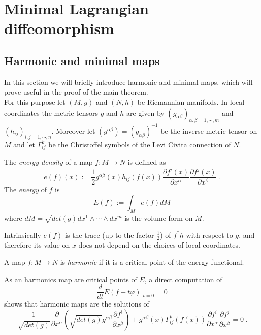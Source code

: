 \chapter{Minimal Lagrangian diffeomorphism}


\section{Harmonic and minimal maps}
In this section we will briefly introduce harmonic and minimal maps, which will prove useful in the proof of the main theorem.\\
For this purpose let $(M,g)$ and $(N,h)$ be Riemannian manifolds. In local coordinates the metric tensors $g$ and $h$ are given by $(g_{\alpha \beta})_{\alpha,\beta = 1,\cdots, m}$ and $(h_{ij})_{i,j= 1,\cdots,n}$. Moreover let $(g^{\alpha \beta}) = (g_{\alpha \beta})^{-1}$ be the inverse metric tensor on $M$ and let $\Gamma^k_{ij}$ be the Christoffel symbols of the Levi Civita connection of $N$.\\
\begin{definition}
    The \textit{energy density} of a map $f:M \to N$ is defined as
    \begin{equation}
        e(f)(x) := \frac{1}{2} g^{\alpha \beta}(x)h_{ij}(f(x)) \frac{\partial f^i (x)}{\partial x^\alpha}  \frac{\partial f^j (x)}{\partial x^\beta} \ .
    \end{equation}
    The \textit{energy} of $f$ is
    \begin{equation}
        E(f) := \int_M e(f)dM
    \end{equation}
    where $dM = \sqrt{det(g)} dx^1 \wedge \cdots \wedge dx^m$ is the volume form on $M$.
\end{definition}
\begin{observation}
    Intrinsically $e(f)$ is the trace (up to the factor $\frac{1}{2}$) of $f^* h$ with respect to $g$, and therefore its value on $x$ does not depend on the choices of local coordinates.
\end{observation}
\begin{definition}
    A map $f:M\to N$ is \textit{harmonic} if it is a critical point of the energy functional.
\end{definition}
As an harmonics map are critical points of $E$, a direct computation of
\[
    \frac{d}{dt}E(f+ t\varphi) |_{t=0} = 0
\]
shows that harmonic maps are the solutions of
\begin{equation}
    \frac{1}{\sqrt{det(g)}} \frac{\partial}{\partial x^\alpha}(\sqrt{det(g)} g^{\alpha\beta} \frac{\partial f^i}{\partial x^\beta}) + g^{\alpha\beta}(x) \Gamma^k_{ij}(f(x)) \frac{\partial f^i}{\partial x^\alpha}  \frac{\partial f^j}{\partial x^\beta} = 0 \ .
\end{equation}


